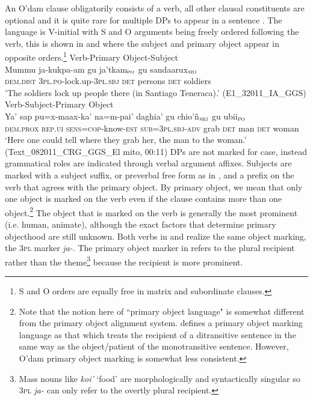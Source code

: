 \documentclass[output=paper]{langsci/langscibook}
\begin{document}
An O’dam clause obligatorily consists of a verb, all other clausal constituents are optional and it is quite rare for multiple DPs to appear in a sentence \citep{willett1991, garcia2014}. The language is V-initial with S and O arguments being freely ordered following the verb, this is shown in  and  where the subject and primary object appear in opposite orders.\footnote{S and O orders are equally free in matrix and subordinate clauses.}
\ea
\label{ex:odam-vpos}
Verb-Primary Object-Subject\\
\gll Mummu ja-kukpa-am {\ob}gu ja’tkam{\cb}$_{\textsc{po}}$ {\ob}gu sandaarux{\cb}$_{\textsc{sbj}}$\\
\textsc{dem.dist} \textsc{3pl.po}-lock.up-3\textsc{pl.sbj} \textsc{det} persons \textsc{det} 	soldiers\\
\glt 'The soldiers lock up people there (in Santiago Teneraca).' (E1\_32011\_IA\_GGS)
\z
\ea
\label{ex:odam-vspo}
Verb-Subject-Primary Object\\
\gll Ya' sap pu=x-maax-ka’ na=m-pai’ daghia’ {\ob}gu chio’\~n{\cb}$_{\textsc{sbj}}$ {\ob}gu ubii{\cb}$_{\textsc{po}}$\\
\textsc{dem.prox} \textsc{rep.ui} \textsc{sens=cop}-know-\textsc{est} \textsc{sub=3pl.sbj-adv} grab \textsc{det} man \textsc{det} woman\\
\glt ‘Here one could tell where they grab her, the man to the woman.’ (Text\_082011\_CRG\_GGS\_El mito, 00:11)
\z
DPs are not marked for case, instead grammatical roles are indicated through verbal argument affixes. Subjects are marked with a subject suffix, or preverbal free form as in , and a prefix on the verb that agrees with the primary object. By primary object, we mean that only one object is marked on the verb even if the clause contains more than one object.\footnote{Note that the notion here of ``primary object language" is somewhat different from the primary object alignment system. \citet{dryer1986} defines a primary object marking language as that which treats the recipient of a ditransitive sentence in the same way as the object/patient of the monotransitive sentence. However, O'dam primary object marking is somewhat less consistent.} The object that is marked on the verb is generally the most prominent (i.e. human, animate), although the exact factors that determine primary objecthood are still unknown. Both verbs in  and  realize the same object marking, the \textsc{3pl} marker \emph{ja-}. The primary object marker in  refers to the plural recipient rather than the theme\footnote{Mass nouns like \emph{koi'} `food' are morphologically and syntactically singular so \textsc{3pl} \emph{ja-} can only refer to the overtly plural recipient.} because the recipient is more prominent.
\end{document}
